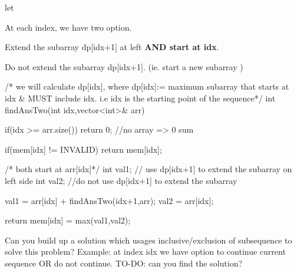 \begin{solution}
    let 

    At each index, we have two option. 
    \begin{asparaenum}[(a)]
        \item Extend the subarray dp[idx+1] at left \textbf{AND start at idx}.
        \item Do not extend the subarray dp[idx+1]. (ie. start a new subarray )
    \end{asparaenum}

    \begin{code}
        /* we will calculate dp[idx], where
        dp[idx]:= maximum subarray that starts at idx & MUST include idx.
        i.e idx is the starting point of the sequence*/
        int findAnsTwo(int idx,vector<int>& arr)
        {
            if(idx >= arr.size()) return 0; //no array => 0 sum
            
            if(mem[idx] != INVALID)
                return mem[idx];
            
            /* both start at arr[idx]*/
            int val1; // use dp[idx+1] to extend the subarray on left side
            int val2; //do not use dp[idx+1] to extend the subarray
            
            val1 = arr[idx] + findAnsTwo(idx+1,arr);
            val2 = arr[idx];
            
            return mem[idx] = max(val1,val2);
        }
    \end{code}
\end{solution}

\begin{solution}[Recursive]
    Can you build up a solution which usages inclusive/exclusion of subsequence to solve this problem?
    Example: at index idx we have option to continue current sequence OR do not continue.
    TO-DO: can you find the solution?
\end{solution}

